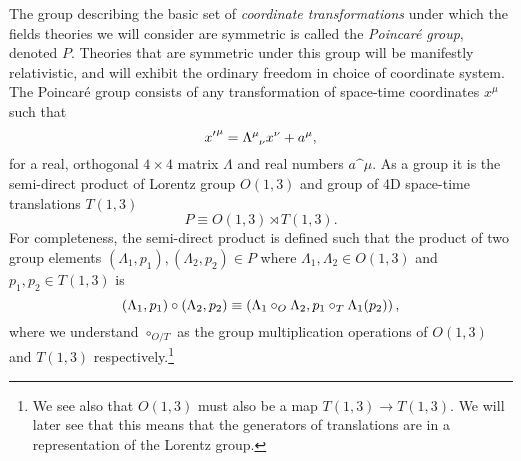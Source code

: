 \documentclass[../main.tex]{subfiles}
\begin{document}
The group describing the basic set of \emph{coordinate transformations} under which the fields theories we will consider are symmetric is called the \emph{Poincaré group}, denoted \(P\).
Theories that are symmetric under this group will be manifestly relativistic, and will exhibit the ordinary freedom in choice of coordinate system.
The Poincaré group consists of any transformation of space-time coordinates \(x^\mu\) such that
\begin{equation}
  {x^\prime}\^\mu = \Lambda\indices{^\mu_\nu} x\^\nu + a\^\mu,
\end{equation}
for a real, orthogonal \(4\times 4\) matrix \(\Lambda\) and real numbers \(a\^\mu\).
As a group it is the semi-direct product of Lorentz group \(O(1,3)\) and group of 4D space-time translations \(T(1,3)\)
\begin{equation}
  P \equiv O(1,3) \rtimes T(1,3).
\end{equation}
For completeness, the semi-direct product is defined such that the product of two group elements \((\Lambda_1, p_1), (\Lambda_2, p_2) \in P\) where \(\Lambda_1, \Lambda_2 \in O(1,3)\) and \(p_1, p_2 \in T(1,3)\) is
\begin{equation}
  (\Lambda_1, p_1) \circ (\Lambda_2, p_2) \equiv \left(\Lambda_1 \circ_O \Lambda_2, p_1 \circ_T \Lambda_1(p_2)\right),
\end{equation}
where we understand \(\circ_{O/T}\) as the group multiplication operations of \(O(1,3)\) and \(T(1,3)\) respectively.\footnote{We see also that \(O(1,3)\) must also be a map \(T(1,3) \to T(1,3)\).
  We will later see that this means that the generators of translations are in a representation of the Lorentz group.}
\end{document}
